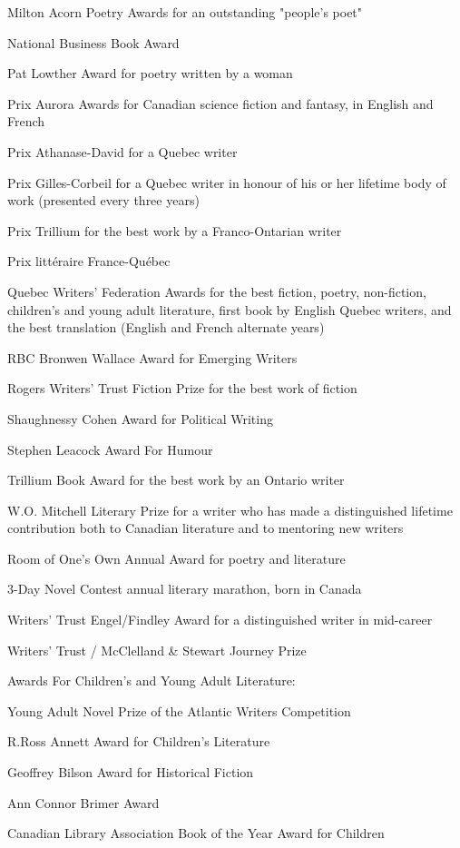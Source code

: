 Milton Acorn Poetry Awards for an outstanding "people's poet"

National Business Book Award

Pat Lowther Award for poetry written by a woman

Prix Aurora Awards for Canadian science fiction and fantasy, in English
and French

Prix Athanase-David for a Quebec writer

Prix Gilles-Corbeil for a Quebec writer in honour of his or her lifetime
body of work (presented every three years)

Prix Trillium for the best work by a Franco-Ontarian writer

Prix littéraire France-Québec

Quebec Writers' Federation Awards for the best fiction, poetry,
non-fiction, children's and young adult literature, first book by
English Quebec writers, and the best translation (English and French
alternate years)

RBC Bronwen Wallace Award for Emerging Writers

Rogers Writers' Trust Fiction Prize for the best work of fiction

Shaughnessy Cohen Award for Political Writing

Stephen Leacock Award For Humour

Trillium Book Award for the best work by an Ontario writer

W.O. Mitchell Literary Prize for a writer who has made a distinguished
lifetime contribution both to Canadian literature and to mentoring new
writers

Room of One's Own Annual Award for poetry and literature

3-Day Novel Contest annual literary marathon, born in Canada

Writers' Trust Engel/Findley Award for a distinguished writer in
mid-career

Writers' Trust / McClelland \& Stewart Journey Prize

Awards For Children's and Young Adult Literature:

Young Adult Novel Prize of the Atlantic Writers Competition

R.Ross Annett Award for Children's Literature

Geoffrey Bilson Award for Historical Fiction

Ann Connor Brimer Award

Canadian Library Association Book of the Year Award for Children

